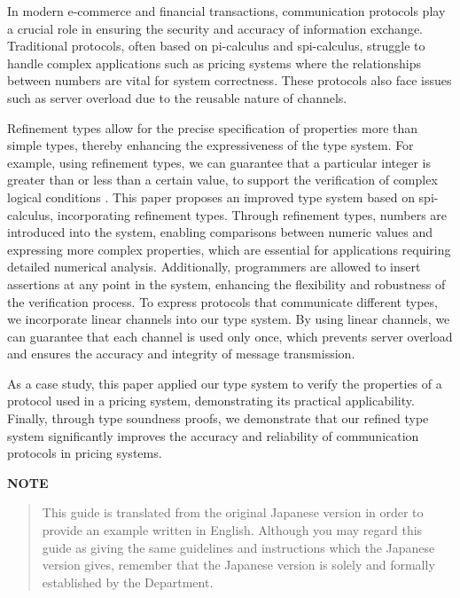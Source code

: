 \documentclass[master,english]{kuisthesis}
\date{February 12th, 2019}
\begin{document}
\maketitle					%

\begin{eabstract}				%
In modern e-commerce and financial transactions, communication protocols play a crucial role in ensuring the security and accuracy of information exchange. Traditional protocols, often based on pi-calculus and spi-calculus, struggle to handle complex applications such as pricing systems where the relationships between numbers are vital for system correctness. These protocols also face issues such as server overload due to the reusable nature of channels.



Refinement types allow for the precise specification of properties more than simple types, thereby enhancing the expressiveness of the type system. For example, using refinement types, we can guarantee that a particular integer is greater than or less than a certain value, to support the verification of complex logical conditions . This paper proposes an improved type system based on spi-calculus, incorporating refinement types. Through refinement types, numbers are introduced into the system, enabling comparisons between numeric values and expressing more complex properties, which are essential for applications requiring detailed numerical analysis. Additionally, programmers are allowed to insert assertions at any point in the system, enhancing the flexibility and robustness of the verification process. To express protocols that communicate different types, we incorporate linear channels into our type system. By using linear channels, we can guarantee that each channel is used only once, which prevents server overload and ensures the accuracy and integrity of message transmission. 

As a case study, this paper applied our type system to verify the properties of a protocol used in a pricing system, demonstrating its practical applicability. Finally, through type soundness proofs, we demonstrate that our refined type system significantly improves the accuracy and reliability of communication protocols in pricing systems.



\par\bigskip\centerline{\bf NOTE}
\begin{quote}
  This guide is translated from the original Japanese version in order
  to provide an example written in English.  Although you may regard
  this guide as giving the same guidelines and instructions which the
  Japanese version gives, remember that the Japanese version is solely
  and formally established by the Department.
\end{quote}
\end{eabstract}
\end{document}
